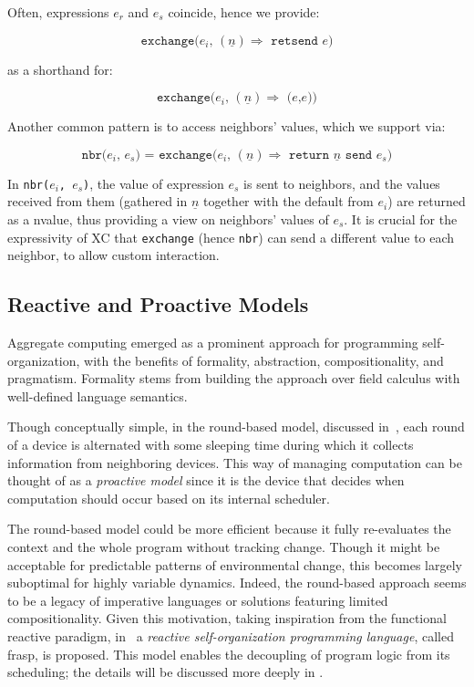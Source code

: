 Often, expressions $e_r$ and $e_s$ coincide, hence we provide:

\[ \texttt{exchange($e_i$, $(\underline{n}) \Rightarrow$ retsend $e$)} \]

as a shorthand for:

\[ \texttt{exchange($e_i$, $(\underline{n}) \Rightarrow$ ($e$,$e$))} \]

Another common pattern is to access neighbors' values, which we support via:

\[ \texttt{nbr($e_i$, $e_s$) = exchange($e_i$, $(\underline{n}) \Rightarrow$ return $\underline{n}$ send $e_s$)} \]

In \texttt{nbr($e_i$, $e_s$)}, the value of expression $e_s$ is sent to neighbors, and the values received from them (gathered in $\underline{n}$ together with the default from $e_i$) are returned as a nvalue, thus providing a view on neighbors' values of $e_s$. It is crucial for the expressivity of XC that \texttt{exchange} (hence \texttt{nbr}) can send a different value to each neighbor, to allow custom interaction.

\subsection{Reactive and Proactive Models}
\label{subsection:reactive-and-proactive-models}

Aggregate computing emerged as a prominent approach for programming self-organization, with the benefits of formality, abstraction, compositionality, and pragmatism. Formality stems from building the approach over field calculus with well-defined language semantics.

Though conceptually simple, in the round-based model, discussed in~\cite{Viroli2018}, each round of a device is alternated with some sleeping time during which it collects information from neighboring devices. This way of managing computation can be thought of as a \textit{proactive model} since it is the device that decides when computation should occur based on its internal scheduler.

The round-based model could be more efficient because it fully re-evaluates the context and the whole program without tracking change. Though it might be acceptable for predictable patterns of environmental change, this becomes largely suboptimal for highly variable dynamics. Indeed, the round-based approach seems to be a legacy of imperative languages or solutions featuring limited compositionality. Given this motivation, taking inspiration from the functional reactive paradigm, in~\cite{Casadei2023} a \textit{reactive self-organization programming language}, called \ac{frasp}, is proposed. This model enables the decoupling of program logic from its scheduling; the details will be discussed more deeply in .